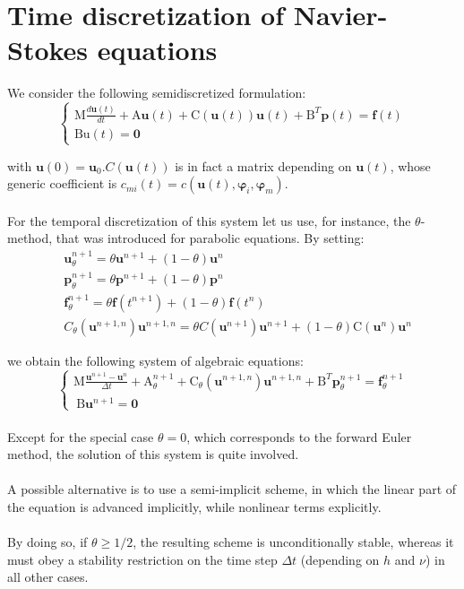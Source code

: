 \documentclass[11pt]{book}
\begin{document}
\section{Time discretization of Navier-Stokes equations}
We consider the following semidiscretized formulation:
\begin{equation}
\left\{\begin{array}{l}
\mathrm{M} \frac{d \mathbf{u}(t)}{d t}+\mathrm{A} \mathbf{u}(t)+\mathrm{C}(\mathbf{u}(t)) \mathbf{u}(t)+\mathrm{B}^{T} \mathbf{p}(t)=\mathbf{f}(t) \\
\mathrm{Bu}(t)=\mathbf{0}
\end{array}\right.
\end{equation}

with $\mathbf{u}(0)=\mathbf{u}_{0} . C(\mathbf{u}(t))$ is in fact a matrix depending on $\mathbf{u}(t)$, whose generic coefficient is $c_{m i}(t)=c\left(\mathbf{u}(t), \boldsymbol{\varphi}_{i}, \boldsymbol{\varphi}_{m}\right)$.\\ \\
For the temporal discretization of this system let us use, for instance, the $\theta$-method, that was introduced for parabolic equations. By setting:
$$
\begin{aligned}
& \mathbf{u}_{\theta}^{n+1}=\theta \mathbf{u}^{n+1}+(1-\theta) \mathbf{u}^{n} \\
& \mathbf{p}_{\theta}^{n+1}=\theta \mathbf{p}^{n+1}+(1-\theta) \mathbf{p}^{n} \\
& \mathbf{f}_{\theta}^{n+1}=\theta \mathbf{f}\left(t^{n+1}\right)+(1-\theta) \mathbf{f}\left(t^{n}\right) \\
& C_{\theta}\left(\mathbf{u}^{n+1, n}\right) \mathbf{u}^{n+1, n}=\theta C\left(\mathbf{u}^{n+1}\right) \mathbf{u}^{n+1}+(1-\theta) \mathrm{C}\left(\mathbf{u}^{n}\right) \mathbf{u}^{n}
\end{aligned}
$$

we obtain the following system of algebraic equations:
\begin{equation}
\left\{\begin{array}{l}
\mathrm{M} \frac{\mathbf{u}^{n+1}-\mathbf{u}^{n}}{\Delta t}+\mathrm{A}_{\theta}^{n+1}+\mathrm{C}_{\theta}\left(\mathbf{u}^{n+1, n}\right) \mathbf{u}^{n+1, n}+\mathrm{B}^{T} \mathbf{p}_{\theta}^{n+1}=\mathbf{f}_{\theta}^{n+1} \\
\mathrm{~B} \mathbf{u}^{n+1}=\mathbf{0}
\end{array}\right.
\end{equation}
\\
Except for the special case $\theta=0$, which corresponds to the forward Euler method, the solution of this system is quite involved.\\ \\
A possible alternative is to use a semi-implicit scheme, in which the linear part of the equation is advanced implicitly, while nonlinear terms explicitly.\\ \\
By doing so, if $\theta \geq 1 / 2$, the resulting scheme is unconditionally stable, whereas it must obey a stability restriction on the time step $\Delta t$ (depending on $h$ and $\nu$) in all other cases.
\end{document}
